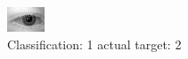 \begin{figure}[h!]
\begin{center}
\includegraphics[width=0.60\columnwidth]{figures/ID475_class_1_target_2.png}
\end{center}
\caption{ Classification: 1 actual target: 2}
\label{fig:ID475_class_1_target_2}
\end{figure}
